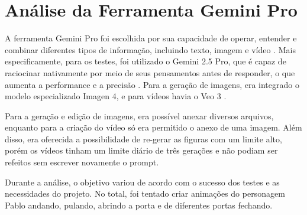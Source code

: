 \FloatBarrier
\section{Análise da Ferramenta Gemini Pro}
\label{s.ferramentaB}

A ferramenta Gemini Pro foi escolhida por sua capacidade de operar, entender e combinar diferentes tipos de informação, incluindo texto, imagem e vídeo \cite{sundarpichai_2023}. Mais especificamente, para os testes, foi utilizado o Gemini 2.5 Pro, que é capaz de raciocinar nativamente por meio de seus pensamentos antes de responder, o que aumenta a performance e a precisão \cite{koraykavukcuoglu_2025}. Para a geração de imagens, era integrado o modelo especializado Imagen 4, e para vídeos havia o Veo 3 \cite{woodward_2025}. 

Para a geração e edição de imagens, era possível anexar diversos arquivos, enquanto para a criação do vídeo só era permitido o anexo de uma imagem. Além disso, era oferecida a possibilidade de re-gerar as figuras com um limite alto, porém os vídeos tinham um limite diário de três gerações e não podiam ser refeitos sem escrever novamente o prompt.

Durante a análise, o objetivo variou de acordo com o sucesso dos testes e as necessidades do projeto. No total, foi tentado criar animações do personagem Pablo andando, pulando, abrindo a porta e de diferentes portas fechando.

